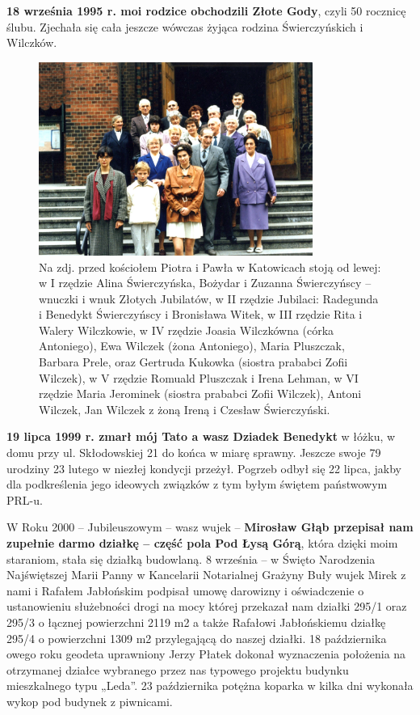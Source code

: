 \textbf{18 września 1995 r. moi rodzice obchodzili Złote Gody}, czyli 50 rocznicę ślubu. Zjechała się cała jeszcze wówczas żyjąca rodzina Świerczyńskich i Wilczków.
\begin{figure}[!h]
\begin{center}
\includegraphics[width=0.8\textwidth]{photo/rodzina_swierczynskich_kosciol_piotra_pawla.jpg}
\caption[Złote Gody Radegundy i Benedykta Świerczyńskich -- zdjęcie zbiorowe]{Na zdj. przed kościołem Piotra i Pawła w Katowicach stoją od lewej: w I rzędzie Alina Świerczyńska, Bożydar i Zuzanna Świerczyńscy -- wnuczki i wnuk Złotych Jubilatów, w II rzędzie Jubilaci: Radegunda i Benedykt Świerczyńscy i Bronisława Witek, w III rzędzie Rita i Walery Wilczkowie, w IV rzędzie Joasia Wilczkówna (córka Antoniego), Ewa Wilczek (żona Antoniego), Maria Pluszczak, Barbara Prele, oraz Gertruda Kukowka (siostra prababci Zofii Wilczek), w V rzędzie Romuald Pluszczak i Irena Lehman, w VI rzędzie Maria Jerominek (siostra prababci Zofii Wilczek), Antoni Wilczek, Jan Wilczek z żoną Ireną i Czesław Świerczyński.}
\end{center}
\end{figure}


\textbf{19 lipca 1999 r. zmarł mój Tato a wasz Dziadek Benedykt} w łóżku, w domu przy ul. Skłodowskiej 21 do końca w miarę sprawny. Jeszcze swoje 79 urodziny 23 lutego w niezłej kondycji przeżył. Pogrzeb odbył się 22 lipca, jakby dla podkreślenia jego ideowych związków z tym byłym świętem państwowym PRL-u.

W Roku 2000 – Jubileuszowym – wasz wujek – \textbf{Mirosław Głąb przepisał nam zupełnie darmo działkę – część pola Pod Łysą Górą}, która dzięki moim staraniom, stała się działką budowlaną. 8 września – w Święto Narodzenia Najświętszej Marii Panny w Kancelarii Notarialnej Grażyny Buły wujek Mirek z nami i Rafałem Jabłońskim podpisał umowę darowizny i oświadczenie o ustanowieniu służebności drogi na mocy której przekazał nam działki 295/1 oraz 295/3 o łącznej powierzchni 2119 m2 a także Rafałowi Jabłońskiemu działkę 295/4 o powierzchni 1309 m2  przylegającą do naszej działki. 18 października owego roku geodeta uprawniony Jerzy Płatek dokonał wyznaczenia położenia na otrzymanej  działce wybranego przez nas typowego projektu budynku mieszkalnego typu „Leda”. 23 października potężna koparka w kilka dni wykonała wykop pod budynek z piwnicami.

